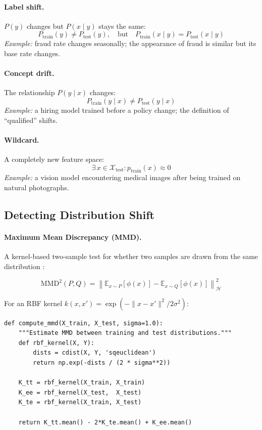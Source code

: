 \paragraph{Label shift.} $P(y)$ changes but $P(x \mid y)$ stays the same:
\[
P_{\mathrm{train}}(y) \neq P_{\mathrm{test}}(y), \quad \text{but} \quad P_{\mathrm{train}}(x \mid y) = P_{\mathrm{test}}(x \mid y)
\]
\textit{Example:} fraud rate changes seasonally; the appearance of fraud is similar but its base rate changes.

\paragraph{Concept drift.} The relationship $P(y \mid x)$ changes:
\[
P_{\mathrm{train}}(y \mid x) \neq P_{\mathrm{test}}(y \mid x)
\]
\textit{Example:} a hiring model trained before a policy change; the definition of ``qualified'' shifts.

\paragraph{Wildcard.} A completely new feature space:
\[
\exists\, x \in \mathcal{X}_{\mathrm{test}} : p_{\mathrm{train}}(x) \approx 0
\]
\textit{Example:} a vision model encountering medical images after being trained on natural photographs.

\subsection{Detecting Distribution Shift}

\paragraph{Maximum Mean Discrepancy (MMD).}
A kernel-based two-sample test for whether two samples are drawn from the same distribution \autocite{gretton2012kernel}:

\[
\mathrm{MMD}^2(P, Q) = \left\|\mathbb{E}_{x \sim P}[\phi(x)] - \mathbb{E}_{x \sim Q}[\phi(x)]\right\|^2_{\mathcal{H}}
\]

For an RBF kernel $k(x, x') = \exp\!\left(-\|x - x'\|^2 / 2\sigma^2\right)$:

\begin{lstlisting}[style=python, caption={MMD estimation between training and test distributions}]
def compute_mmd(X_train, X_test, sigma=1.0):
    """Estimate MMD between training and test distributions."""
    def rbf_kernel(X, Y):
        dists = cdist(X, Y, 'sqeuclidean')
        return np.exp(-dists / (2 * sigma**2))

    K_tt = rbf_kernel(X_train, X_train)
    K_ee = rbf_kernel(X_test,  X_test)
    K_te = rbf_kernel(X_train, X_test)

    return K_tt.mean() - 2*K_te.mean() + K_ee.mean()
\end{lstlisting}

